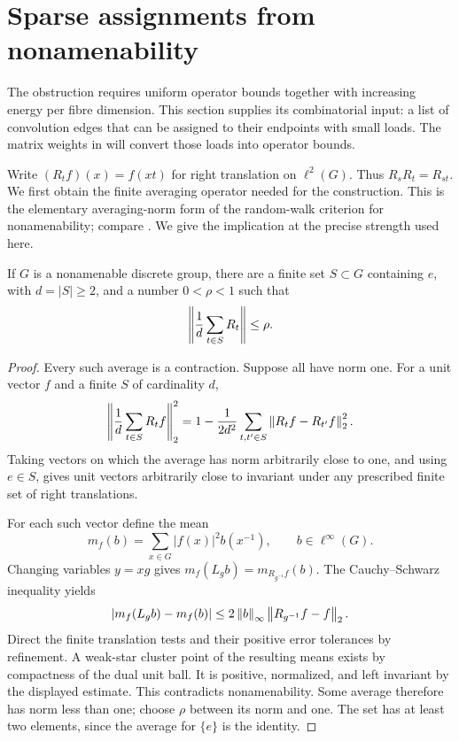 \section{Sparse assignments from nonamenability}\label{sec:sparse}

The obstruction requires uniform operator bounds together with increasing
energy per fibre dimension. This section supplies its combinatorial
input: a list of convolution edges that can be assigned to their
endpoints with small loads. The matrix weights in 
will convert those loads into operator bounds.

Write \((R_tf)(x)=f(xt)\) for right translation on \(\ell^2(G)\).
Thus \(R_sR_t=R_{st}\). We first obtain the finite averaging operator
needed for the construction. This is the elementary averaging-norm
form of the random-walk criterion for nonamenability; compare
\cite{Kesten1959}. We give the implication at the precise strength
used here.

\begin{lemma}\label{lem:contracting-average}
If \(G\) is a nonamenable discrete group, there are a finite set
\(S\subset G\) containing \(e\), with \(d=|S|\ge2\), and a number
\(0<\rho<1\) such that
\[
 \left\lVert\frac1d\sum_{t\in S}R_t\right\rVert\le\rho.
\]
\end{lemma}

\begin{proof}
Every such average is a contraction. Suppose all have norm one.
For a unit vector \(f\) and a finite \(S\) of cardinality \(d\),
\[
 \left\lVert\frac1d\sum_{t\in S}R_tf\right\rVert_2^2
 =1-\frac1{2d^2}\sum_{t,t'\in S}\left\lVert R_tf-R_{t'}f\right\rVert_2^2.
\]
Taking vectors on which the average has norm arbitrarily close to one,
and using \(e\in S\), gives unit vectors arbitrarily close to invariant
under any prescribed finite set of right translations.

For each such vector define the mean
\[
 m_f(b)=\sum_{x\in G}|f(x)|^2b(x^{-1}),\qquad b\in\ell^\infty(G).
\]
Changing variables \(y=xg\) gives
\(m_f(L_gb)=m_{R_{g^{-1}}f}(b)\). The Cauchy--Schwarz inequality yields
\[
 |m_f(L_gb)-m_f(b)|
 \le2\left\lVert b\right\rVert_\infty\left\lVert R_{g^{-1}}f-f\right\rVert_2.
\]
Direct the finite translation tests and their positive error tolerances
by refinement. A weak-star cluster point of the resulting means exists
by compactness of the dual unit ball. It is positive, normalized, and
left invariant by the displayed estimate. This contradicts
nonamenability. Some average therefore has norm less than one; choose
\(\rho\) between its norm and one. The set has at least two elements,
since the average for \(\{e\}\) is the identity.
\end{proof}

